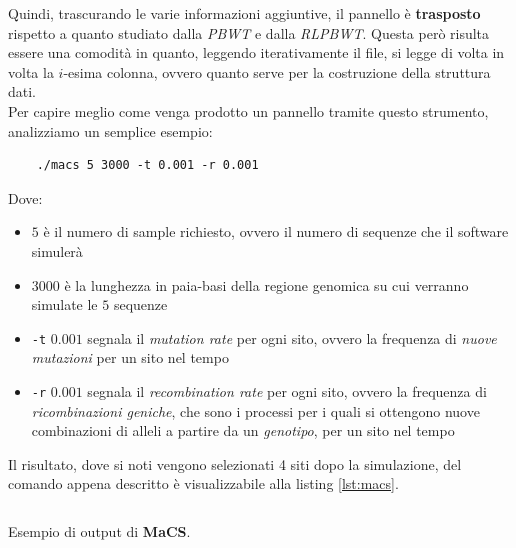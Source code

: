 Quindi, trascurando le varie informazioni aggiuntive, il pannello è
\textbf{trasposto} rispetto a quanto studiato dalla \textit{PBWT} e dalla
\textit{RLPBWT}. Questa però risulta essere una comodità in quanto, leggendo
iterativamente il file, si legge di volta in volta la $i$-esima colonna, ovvero
quanto serve per la costruzione della struttura dati.\\
Per capire meglio come venga prodotto un pannello tramite questo strumento,
analizziamo un semplice esempio:
\begin{shaded}
  \begin{verbatim}
    ./macs 5 3000 -t 0.001 -r 0.001
  \end{verbatim}
\end{shaded}
\noindent
Dove:
\begin{itemize}
  \item $5$ è il numero di sample richiesto, ovvero il numero di sequenze che
  il software simulerà
  \item $3000$ è la lunghezza in paia-basi della regione genomica su cui
  verranno simulate le $5$ sequenze
  \item \texttt{-t} $0.001$ segnala il \textit{mutation rate} per ogni sito,
  ovvero la frequenza di \textit{nuove mutazioni} per un sito nel tempo 
  \item \texttt{-r} $0.001$ segnala il \textit{recombination rate} per ogni
  sito, ovvero la frequenza di \textit{ricombinazioni geniche}, che sono i
  processi per i quali si ottengono nuove combinazioni di alleli a partire da un
  \textit{genotipo}, per un sito nel tempo 
\end{itemize}
Il risultato, dove si noti vengono selezionati 4 siti dopo la simulazione, del
comando appena descritto è visualizzabile alla listing \ref{lst:macs}.\\
\begin{listing}[H]
  \inputminted[obeytabs]{text}{code/example.macs}
  \caption{Esempio di output di \textbf{MaCS}.}
  \label{lst:macs}
\end{listing}
